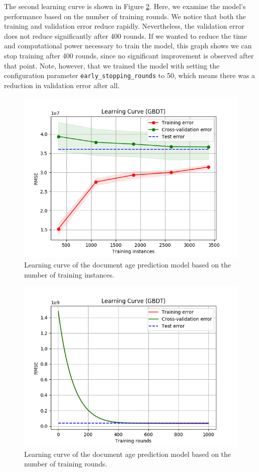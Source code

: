 The second learning curve is shown in Figure \ref{fig:doc-curve2}. Here, we examine the model's performance based on the number of training rounds. We notice that both the training and validation error reduce rapidly. Nevertheless, the validation error does not reduce significantly after 400 rounds. If we wanted to reduce the time and computational power necessary to train the model, this graph shows we can stop training after 400 rounds, since no significant improvement is observed after that point. Note, however, that we trained the model with setting the configuration parameter \texttt{early\_stopping\_rounds} to 50, which means there was a reduction in validation error after all.

\begin{figure}
\centering
\includegraphics[width=0.8\linewidth]{img/doc_learning_curve.png}
\caption{Learning curve of the document age prediction model based on the number of training instances.}
\label{fig:doc-curve1}
\end{figure}

\begin{figure}
\centering
\includegraphics[width=0.8\linewidth]{img/doc_learning_curve2.png}
\caption{Learning curve of the document age prediction model based on the number of training rounds.}
\label{fig:doc-curve2}
\end{figure}

